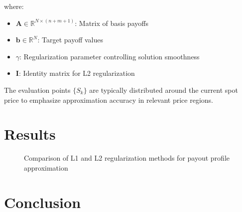 \documentclass[12pt]{article}
\begin{document}
where:
\begin{itemize}
\item \( \mathbf{A} \in \mathbb{R}^{N \times (n+m+1)} \): Matrix of basis payoffs
\item \( \mathbf{b} \in \mathbb{R}^N \): Target payoff values
\item \( \gamma \): Regularization parameter controlling solution smoothness
\item \( \mathbf{I} \): Identity matrix for L2 regularization
\end{itemize}

The evaluation points \( \{S_k\} \) are typically distributed around the current
spot price to emphasize approximation accuracy in relevant price regions.

\section{Results}
\begin{figure}[htbp]
\centering

\caption{Comparison of L1 and L2 regularization methods for payout profile approximation}
\label{fig:regularization}
\end{figure}

\section{Conclusion}



\end{document}
